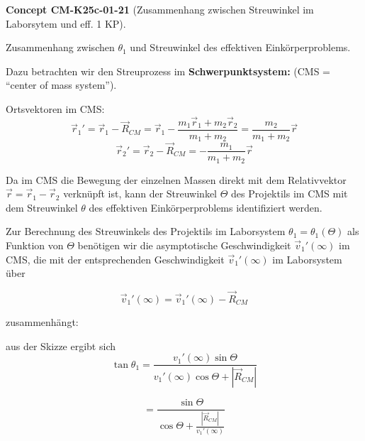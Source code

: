 \documentclass[10pt, letterpaper]{article}
\newcommand{\CustomHeading}[3]{%
  \par\medskip\noindent%
  \textbf{#1 #2} \textnormal{(#3)}.\enskip%
}
\newenvironment{CONC}[2]{\begin{unitbox}\CustomHeading{Concept}{#1}{#2}}{\end{unitbox}}
\begin{document}
\begin{CONC}{CM-K25c-01-21}{Zusammenhang zwischen Streuwinkel im Laborsytem und eff. 1 KP}
Zusammenhang zwischen $\theta_1$ und Streuwinkel des effektiven Einkörperproblems.

Dazu betrachten wir den Streuprozess im 
\textbf{Schwerpunktsystem:} (CMS = ``center of mass system'').

Ortsvektoren im CMS:
\[ \vec{r}_1' = \vec{r}_1 - \vec{R}_{CM} = \vec{r}_1 - \frac{m_1\vec{r}_1+m_2\vec{r}_2}{m_1+m_2} = \frac{m_2}{m_1+m_2}\vec{r} \]
\[ \vec{r}_2' = \vec{r}_2 - \vec{R}_{CM} = -\frac{m_1}{m_1+m_2}\vec{r} \]

\begin{center}
\end{center}


Da im CMS die Bewegung der einzelnen Massen direkt mit dem Relativvektor $\vec{r}=\vec{r}_1-\vec{r}_2$ verknüpft ist, kann der Streuwinkel $\Theta$ des Projektils im CMS mit dem Streuwinkel $\theta$ des effektiven Einkörperproblems identifiziert werden.

Zur Berechnung des Streuwinkels des Projektils im Laborsystem $\theta_1 = \theta_1(\Theta)$ als Funktion von $\Theta$ benötigen wir die asymptotische Geschwindigkeit $\vec{v}_1'(\infty)$ im CMS, die mit der entsprechenden Geschwindigkeit $\vec{v}_1'(\infty)$ im Laborsystem über

\[\vec{v}_1'(\infty) = \vec{v}_1'(\infty) - \vec{R}_{CM}\]

zusammenhängt:

aus der Skizze ergibt sich
\[\tan\theta_1 = \frac{v_1'(\infty)\sin\Theta}{v_1'(\infty)\cos\Theta + |\vec{R}_{CM}|}\]

\[= \frac{\sin\Theta}{\cos\Theta + \frac{|\vec{R}_{CM}|}{v_1'(\infty)}}\]


\end{CONC}
\end{document}
